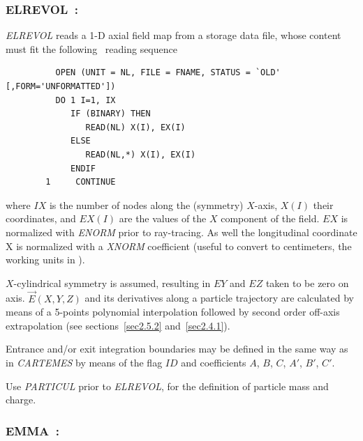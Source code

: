 \newpage

\subsubsection*{ELREVOL~: \ELREVOLTitl}  \label{ELREVOL}
\medskip

\textsl{ELREVOL}  reads a 1-D axial field map from a storage data file,
whose content must fit the following \FORTRAN\ reading sequence  


{\footnotesize
\begin{verbatim}
	      OPEN (UNIT = NL, FILE = FNAME, STATUS = `OLD' [,FORM='UNFORMATTED'])
	      DO 1 I=1, IX
	         IF (BINARY) THEN 
	            READ(NL) X(I), EX(I)
	         ELSE
	            READ(NL,*) X(I), EX(I)
	         ENDIF 
        1     CONTINUE
\end{verbatim}}%
\medskip
  
\noindent where $IX$ is the number of nodes along the (symmetry) $X$-axis, $X(I)$ their 
coordinates, and $EX(I)$ are the values of the $X$ component of the field. $EX$ is 
normalized with \textsl{ENORM} prior to ray-tracing. As well the longitudinal coordinate  X is normalized with 
a  \textsl{XNORM} coefficient (useful to convert to centimeters, the working units in  \zgoubi). 


\medskip

\noindent$X$-cylindrical symmetry is assumed, resulting in $EY$
and $EZ$ taken to be zero on axis. $ \vec  E(X,Y,Z) $ and its derivatives along a particle
trajectory are calculated by means of a 5-points polynomial interpolation followed by second 
order off-axis extrapolation (see sections~\ref{sec2.5.2} and~\ref{sec2.4.1}).  

\medskip

\noindent Entrance and/or exit integration boundaries may be defined in the same way 
as in \textsl{CARTEMES} by means of the flag $ID$ and coefficients  
$A$, $B$, $C$, $A'$, $B'$, $C'$.  
\medskip

\noindent Use \textsl{PARTICUL} prior to \textsl{ELREVOL}, for the
 definition of particle mass and charge.



\newpage

\subsubsection*{EMMA~: \EMMATitl} \label{EMMA} 
\medskip

